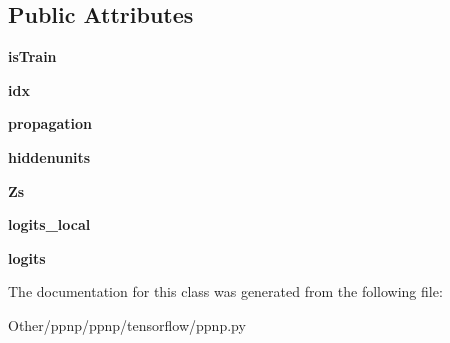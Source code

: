 \subsection*{Public Attributes}
\begin{DoxyCompactItemize}
\item 
\mbox{\label{classppnp_1_1tensorflow_1_1ppnp_1_1PPNP_a0c225e8cc4b798f19755ffe3cc24a931}} 
{\bfseries is\+Train}
\item 
\mbox{\label{classppnp_1_1tensorflow_1_1ppnp_1_1PPNP_a9e37f38b8c585ea729b6b62a21c900d4}} 
{\bfseries idx}
\item 
\mbox{\label{classppnp_1_1tensorflow_1_1ppnp_1_1PPNP_af6f2f320485c859d65132dd5a3dd5152}} 
{\bfseries propagation}
\item 
\mbox{\label{classppnp_1_1tensorflow_1_1ppnp_1_1PPNP_a38556c83dcffb09f5e22859d3bdf9287}} 
{\bfseries hiddenunits}
\item 
\mbox{\label{classppnp_1_1tensorflow_1_1ppnp_1_1PPNP_a7111b7c059e447a1dd9fb15a5930f0c9}} 
{\bfseries Zs}
\item 
\mbox{\label{classppnp_1_1tensorflow_1_1ppnp_1_1PPNP_ade1b0b63217bd8f85342dca2ca2cf87f}} 
{\bfseries logits\+\_\+local}
\item 
\mbox{\label{classppnp_1_1tensorflow_1_1ppnp_1_1PPNP_a094f5198cbd36605d790d5a27f1066fd}} 
{\bfseries logits}
\end{DoxyCompactItemize}


The documentation for this class was generated from the following file\+:\begin{DoxyCompactItemize}
\item 
Other/ppnp/ppnp/tensorflow/ppnp.\+py\end{DoxyCompactItemize}
